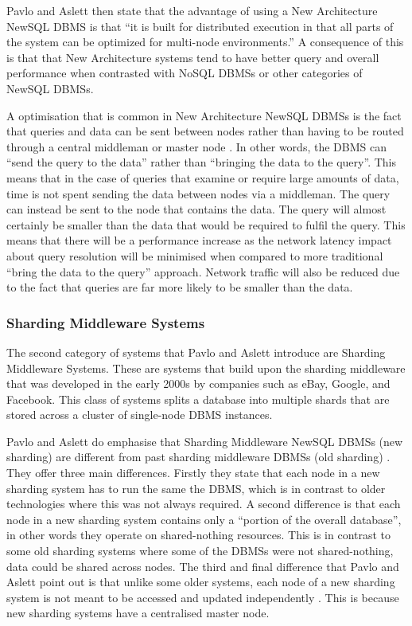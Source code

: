 \documentclass[10pt, conference]{IEEEtran}
\begin{document}
Pavlo and Aslett then state that the advantage of using a New Architecture NewSQL DBMS is that ``it is built for distributed execution in that all parts of the system can be optimized for multi-node environments.'' \cite{pavlo} A consequence of this is that that New Architecture systems tend to have better query and overall performance when contrasted with NoSQL DBMSs or other categories of NewSQL DBMSs. 

A optimisation that is common in New Architecture NewSQL DBMSs is the fact that queries and data can be sent between nodes rather than having to be routed through a central middleman or master node  \cite{pavlo}. In other words, the DBMS can ``send the query to the data'' rather than ``bringing the data to the query''. This means that in the case of queries that examine or require large amounts of data, time is not spent sending the data between nodes via a middleman. The query can instead be sent to the node that contains the data. The query will almost certainly be smaller than the data that would be required to fulfil the query. This means that there will be a performance increase as the network latency impact about query resolution will be minimised when compared to more traditional ``bring the data to the query'' approach. Network traffic will also be reduced due to the fact that queries are far more likely to be smaller than the data.

\subsubsection{Sharding Middleware Systems}

The second category of systems that Pavlo and Aslett introduce are Sharding Middleware Systems. These are systems that build upon the sharding middleware that was developed in the early 2000s by companies such as eBay, Google, and Facebook. This class of systems splits a database into multiple shards that are stored across a cluster of single-node DBMS instances.

Pavlo and Aslett do emphasise that Sharding Middleware NewSQL DBMSs (new sharding) are different from past sharding middleware DBMSs (old sharding)  \cite{pavlo}. They offer three main differences. Firstly they state that each node in a new sharding system has to run the same the DBMS, which is in contrast to older technologies where this was not always required. A second difference is that each node in a new sharding system contains only a ``portion of the overall database'', in other words they operate on shared-nothing resources. This is in contrast to some old sharding systems where some of the DBMSs were not shared-nothing, data could be shared across nodes. The third and final difference that Pavlo and Aslett point out is that unlike some older systems, each node of a new sharding system is not meant to be accessed and updated independently  \cite{pavlo}. This is because new sharding systems have a centralised master node.
\end{document}
